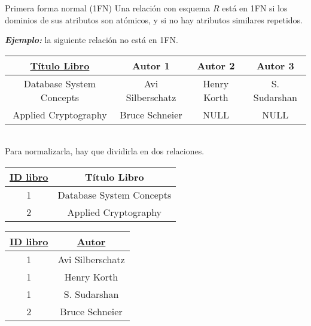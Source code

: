 \documentclass[a4paper, twoside]{article}
\begin{document}
\begin{definicion}[0.9\textwidth]{Primera forma normal (1FN)}
	Una relación con esquema $R$ está en 1FN si los dominios de sus atributos son atómicos, y si no hay atributos similares repetidos.
\end{definicion}

\textbf{\emph{Ejemplo:}} la siguiente relación no está en 1FN.\\

\begin{center}
	\begin{tabular}{|c|c|c|c|}
		\hline 
		\uline{Título Libro} & Autor 1 & Autor 2 & Autor 3\\
		\hline 
		\hline 
		Database System Concepts & Avi Silberschatz & Henry Korth & S. Sudarshan\\
		\hline 
		Applied Cryptography & Bruce Schneier & NULL & NULL\\
		\hline 
	\end{tabular}
\end{center}

~\\

Para normalizarla, hay que dividirla en dos relaciones.\\

\begin{minipage}{0.5\textwidth}
	\begin{center}
		\begin{tabular}{|c|c|}
			\hline 
			\uline{ID libro} & Título Libro\\
			\hline 
			\hline 
			1 & Database System Concepts\\
			\hline 
			2 & Applied Cryptography\\
			\hline 
		\end{tabular}
	\end{center}
\end{minipage}
\begin{minipage}{0.45\textwidth}
	\begin{center}
		\begin{tabular}{|c|c|}
			\hline 
			\uline{ID libro} & \uline{Autor}\\
			\hline 
			\hline 
			1 & Avi Silberschatz\\
			\hline 
			1 & Henry Korth\\
			\hline 
			1 & S. Sudarshan\\
			\hline 
			2 & Bruce Schneier\\
			\hline 
		\end{tabular}
	\end{center}
\end{minipage}
\end{document}
